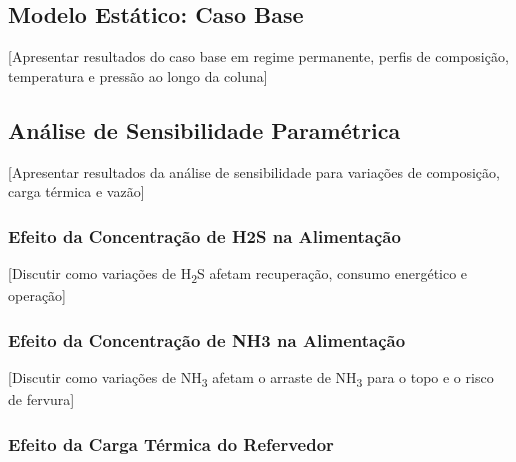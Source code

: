 
\subsection{Modelo Estático: Caso Base}

[Apresentar resultados do caso base em regime permanente, perfis de composição, temperatura e pressão ao longo da coluna]



\subsection{Análise de Sensibilidade Paramétrica}

[Apresentar resultados da análise de sensibilidade para variações de composição, carga térmica e vazão]

\subsubsection{Efeito da Concentração de H2S na Alimentação}

[Discutir como variações de H\textsubscript{2}S afetam recuperação, consumo energético e operação]

\subsubsection{Efeito da Concentração de NH3 na Alimentação}

[Discutir como variações de NH\textsubscript{3} afetam o arraste de NH\textsubscript{3} para o topo e o risco de fervura]

\subsubsection{Efeito da Carga Térmica do Refervedor}

